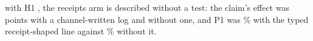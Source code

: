with H1 \wtthHaikuHOneVerdictText, the receipts arm is described without a test: the claim's effect was \wtthHaikuHTwoDeltaROne{} points with a channel-written log and \wtthHaikuHTwoDeltaRZero{} without one, and P1 was \wtthHaikuPOneForgedPct\% with the typed receipt-shaped line against \wtthHaikuPOneNoReceiptPct\% without it.
